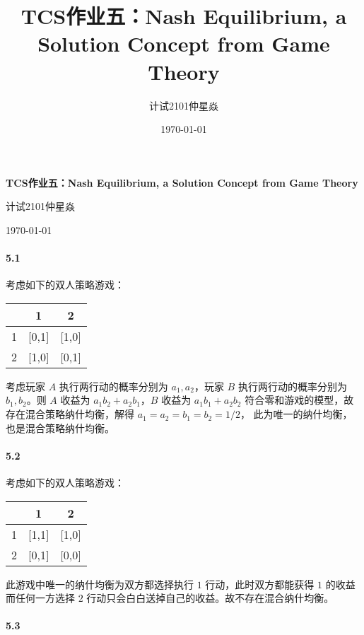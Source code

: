 \documentclass[12pt, a4paper, oneside]{ctexart}
\title{\textbf{TCS作业五：Nash Equilibrium, a Solution Concept from Game Theory}}
\author{计试2101仲星焱}
\date{\today}
\begin{document}
	\textbf{TCS作业五：Nash Equilibrium, a Solution Concept from Game Theory}
	
	计试2101仲星焱
	
	\today
	
	\paragraph{5.1} 
	
	考虑如下的双人策略游戏：
	
	\begin{table}[htbp]
		\centering
		\begin{tabular}{|c|c|c|}
			\toprule
			& 1     & 2 \\
			\midrule
			1     & [0,1] & [1,0] \\
			\midrule
			2     & [1,0] & [0,1] \\
			\bottomrule
		\end{tabular}%
		\label{tab:addlabel}%
	\end{table}%

	考虑玩家 $A$ 执行两行动的概率分别为 $a_1,a_2$，玩家 $B$ 执行两行动的概率分别为 $b_1,b_2$。则 $A$ 收益为 $a_1b_2+a_2b_1$，$B$ 收益为 $a_1b_1+a_2b_2$ 符合零和游戏的模型，故存在混合策略纳什均衡，解得 $a_1=a_2=b_1=b_2=1/2$， 此为唯一的纳什均衡，也是混合策略纳什均衡。
	
	\paragraph{5.2}
	
	考虑如下的双人策略游戏：
	
	\begin{table}[htbp]
		\centering
		\begin{tabular}{|c|c|c|}
			\toprule
			& 1     & 2 \\
			\midrule
			1     & [1,1] & [1,0] \\
			\midrule
			2     & [0,1] & [0,0] \\
			\bottomrule
		\end{tabular}%
		\label{tab:addlabel}%
	\end{table}%
	
	此游戏中唯一的纳什均衡为双方都选择执行 $1$ 行动，此时双方都能获得 $1$ 的收益而任何一方选择 $2$ 行动只会白白送掉自己的收益。故不存在混合纳什均衡。
	
	\paragraph{5.3}
	
\end{document}
